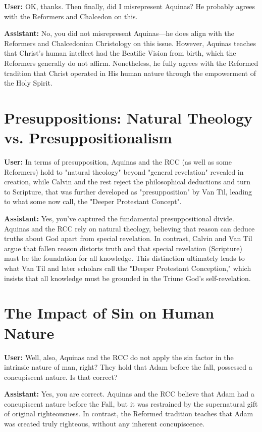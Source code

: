 \documentclass{article}
\begin{document}
\textbf{User:} OK, thanks. Then finally, did I misrepresent Aquinas? He probably agrees with the Reformers and Chalcedon on this.

\textbf{Assistant:} No, you did not misrepresent Aquinas—he does align with the Reformers and Chalcedonian Christology on this issue. However, Aquinas teaches that Christ’s human intellect had the Beatific Vision from birth, which the Reformers generally do not affirm. Nonetheless, he fully agrees with the Reformed tradition that Christ operated in His human nature through the empowerment of the Holy Spirit.

\section{Presuppositions: Natural Theology vs. Presuppositionalism}

\textbf{User:} In terms of presupposition, Aquinas and the RCC (as well as some Reformers) hold to "natural theology" beyond "general revelation" revealed in creation, while Calvin and the rest reject the philosophical deductions and turn to Scripture, that was further developed as "presupposition" by Van Til, leading to what some now call, the "Deeper Protestant Concept".

\textbf{Assistant:} Yes, you’ve captured the fundamental presuppositional divide. Aquinas and the RCC rely on natural theology, believing that reason can deduce truths about God apart from special revelation. In contrast, Calvin and Van Til argue that fallen reason distorts truth and that special revelation (Scripture) must be the foundation for all knowledge. This distinction ultimately leads to what Van Til and later scholars call the "Deeper Protestant Conception," which insists that all knowledge must be grounded in the Triune God's self-revelation.

\section{The Impact of Sin on Human Nature}

\textbf{User:} Well, also, Aquinas and the RCC do not apply the sin factor in the intrinsic nature of man, right? They hold that Adam before the fall, possessed a concupiscent nature. Is that correct?

\textbf{Assistant:} Yes, you are correct. Aquinas and the RCC believe that Adam had a concupiscent nature before the Fall, but it was restrained by the supernatural gift of original righteousness. In contrast, the Reformed tradition teaches that Adam was created truly righteous, without any inherent concupiscence.
\end{document}
